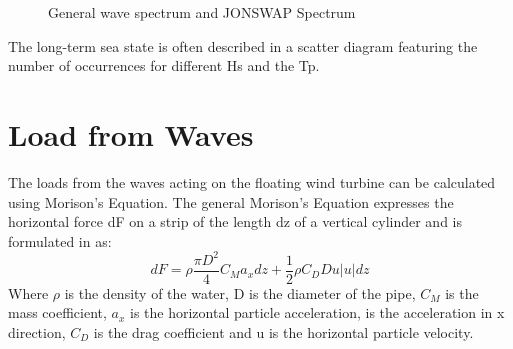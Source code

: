 \begin{figure}[H]
\hfill
{}\hfill
\caption[$\; \:$General wave spectrum and JONSWAP Spectrum]{General wave spectrum and JONSWAP Spectrum \cite{Faltinsen1990}}
\label{fig:spectrum}
\end{figure}

\noindent The long-term sea state is often described in a scatter diagram featuring the number of occurrences for different Hs and the Tp.  \newline
\newline\newline

\section{Load from Waves}
The loads from the waves acting on the floating wind turbine can be calculated using Morison's Equation. The general Morison's Equation expresses the horizontal force dF on a strip of the length dz of a vertical cylinder and is formulated in \cite{BP2007} as:
\begin{equation}
    dF=\rho \frac{\pi D^2}{4} C_M a_x dz +\frac{1}{2} \rho C_D Du |u|dz
    \label{eq:morison}
\end{equation}
\noindent Where $\rho$ is the density of the water, D is the diameter of the pipe, $C_M$ is the mass coefficient, $a_x$ is the horizontal particle acceleration, is the acceleration in x direction, $C_D$ is the drag coefficient and u is the horizontal particle velocity.

